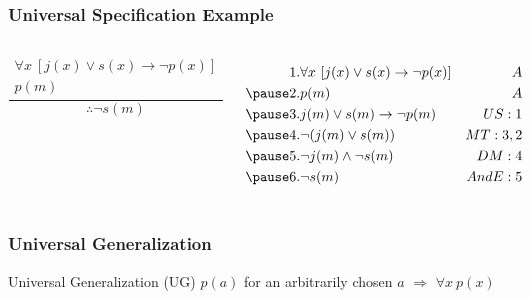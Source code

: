 \documentclass[dvipsnames]{beamer}
\begin{document}
\begin{frame}
  \frametitle{Universal Specification Example}

  \begin{small}
  \begin{columns}
    \[
    \frac
      {
        \begin{array}{c}
          \forall x~[j(x) \vee s(x) \rightarrow \neg p(x)]\\
          p(m)
        \end{array}
      }
      {
        \therefore \neg s(m)
      }
    \]

    \pause
    \begin{eqnarray*}
      1. & \forall x~[j(x) \vee s(x) \rightarrow \neg p(x)] & A\\\pause
      2. & p(m)                                             & A\\\pause
      3. & j(m) \vee s(m) \rightarrow \neg p(m)             & US:1\\\pause
      4. & \neg (j(m) \vee s(m))                            & MT:3,2\\\pause
      5. & \neg j(m) \wedge \neg s(m)                       & DM:4\\\pause
      6. & \neg s(m)                                        & AndE:5
    \end{eqnarray*}
  \end{columns}
  \end{small}
\end{frame}

\begin{frame}
  \frametitle{Universal Generalization}

  \begin{block}{Universal Generalization (UG)}
    $p(a)$ for an \alert{arbitrarily chosen} $a$
      $\Rightarrow$ $\forall x~p(x)$
  \end{block}
\end{frame}
\end{document}
